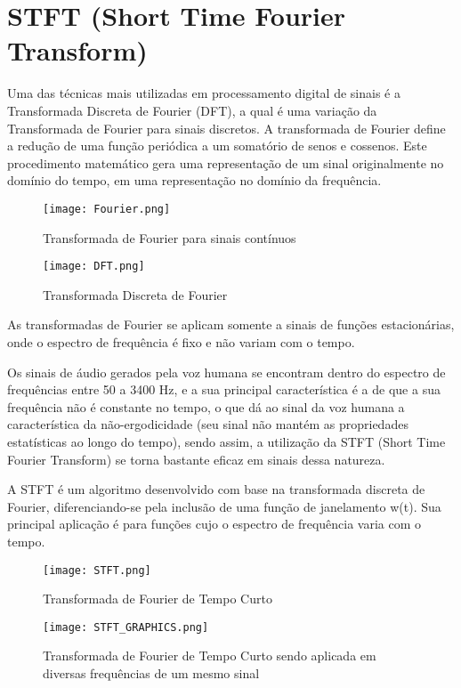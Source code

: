 \section*{STFT (Short Time Fourier Transform)}\label{sec:est_obs}
Uma das técnicas mais utilizadas em processamento digital de sinais é a Transformada Discreta de Fourier (DFT), a qual é uma variação da Transformada de Fourier para sinais discretos. A transformada de Fourier define a redução de uma função periódica a um somatório de senos e cossenos. Este procedimento matemático gera uma representação de um sinal originalmente no domínio do tempo, em uma representação no domínio da frequência.

\begin{figure}[h]
	\centering
	\texttt{[image: Fourier.png]}
	\label{fig:Fourier}
	\caption{Transformada de Fourier para sinais contínuos}
\end{figure}

\begin{figure}[h]
	\centering
	\texttt{[image: DFT.png]}
	\label{fig:DFT}
	\caption{Transformada Discreta de Fourier}
\end{figure}

As transformadas de Fourier se aplicam somente a sinais de funções estacionárias, onde o espectro de frequência é fixo e não variam com o tempo.

Os sinais de áudio gerados pela voz humana se encontram dentro do espectro de frequências entre 50 a 3400 Hz, e a sua principal característica é a de que a sua frequência não é constante no tempo, o que dá ao sinal da voz humana a característica da não-ergodicidade (seu sinal não mantém as propriedades estatísticas ao longo do tempo), sendo assim, a utilização da STFT (Short Time Fourier Transform) se torna bastante eficaz em sinais dessa natureza.

A STFT é um algoritmo desenvolvido com base na transformada discreta de Fourier, diferenciando-se pela inclusão de uma função de janelamento w(t). Sua principal aplicação é para funções cujo o espectro de frequência varia com o tempo.

\begin{figure}[h]
	\centering
	\texttt{[image: STFT.png]}
	\label{fig:STFT}
	\caption{Transformada de Fourier de Tempo Curto}
\end{figure}

\begin{figure}[h]
	\centering
	\texttt{[image: STFT\_GRAPHICS.png]}
	\label{fig:STFT_GRAPHICS}
	\caption{Transformada de Fourier de Tempo Curto sendo aplicada em diversas frequências de um mesmo sinal}
\end{figure}
\newpage
 
